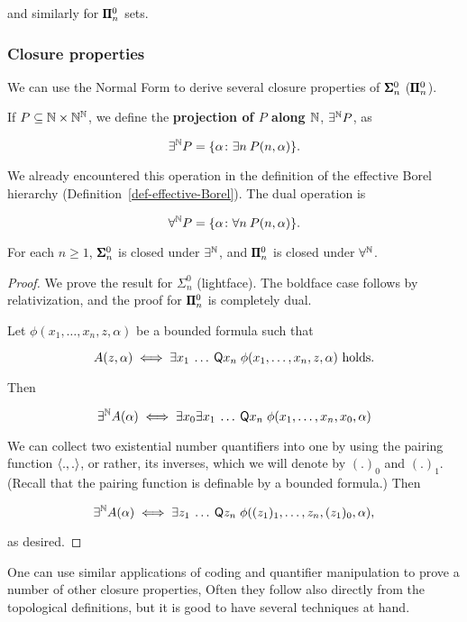 and similarly for $\pmb{\Pi}^0_n$ sets.

\subsubsection{Closure properties}

We can use the Normal Form to derive several closure properties of $\pmb{\Sigma}^0_n$ ($\pmb{\Pi}^0_n$).

If $P \subseteq \mathbb{N} \times \mathbb{N}^{\mathbb{N}}$, we define the \textbf{projection of $P$ along $\mathbb{N}$}, $\exists^{\mathbb{N}} P$, as

\begin{equation}
\exists^{\mathbb{N}} P = \{ \alpha \colon \exists n \: P(n,\alpha)\}.
\end{equation}

We already encountered this operation in the definition of the effective Borel hierarchy (Definition~\ref{def-effective-Borel}). The dual operation is

\begin{equation}
\forall^{\mathbb{N}} P = \{ \alpha \colon \forall n \: P(n,\alpha)\}.
\end{equation}

\begin{proposition}For each $n \geq 1$, $\pmb{\Sigma}^0_n$ is closed under $\exists^{\mathbb{N}}$, and $\pmb{\Pi}^0_n$ is closed under $\forall^{\mathbb{N}}$.

\end{proposition}\begin{proof}We prove the result for $\Sigma^0_n$ (lightface). The boldface case follows by relativization, and the proof for $\pmb{\Pi}^0_n$ is completely dual.

Let $\phi(x_1, \dots, x_n, z, \alpha)$ be a bounded formula such that

\begin{equation}
A(z,\alpha) \iff \exists x_1 \: \dots \: \mathsf{Q} x_n \; \phi(x_1, \dots, x_n, z, \alpha) \text{ holds}.
\end{equation}

Then

\begin{equation}
\exists^{\mathbb{N}} A(\alpha) \iff \exists x_0 \exists x_1 \: \dots \: \mathsf{Q} x_n \; \phi(x_1, \dots, x_n, x_0,\alpha)
\end{equation}

We can collect two existential number quantifiers into one by using the pairing function $\langle .,. \rangle$, or rather, its inverses, which we will denote by $(.)_0$ and $(.)_1$. (Recall that the pairing function is definable by a bounded formula.)
Then

\begin{equation}
\exists^{\mathbb{N}} A(\alpha) \iff \exists z_1  \: \dots \: \mathsf{Q} z_n \; \phi((z_1)_1, \dots, z_n, (z_1)_0,\alpha),
\end{equation}

as desired.

\end{proof}One can use similar applications of coding and quantifier manipulation to prove a number of other closure properties, Often they follow also directly from the topological definitions, but it is good to have several techniques at hand.

